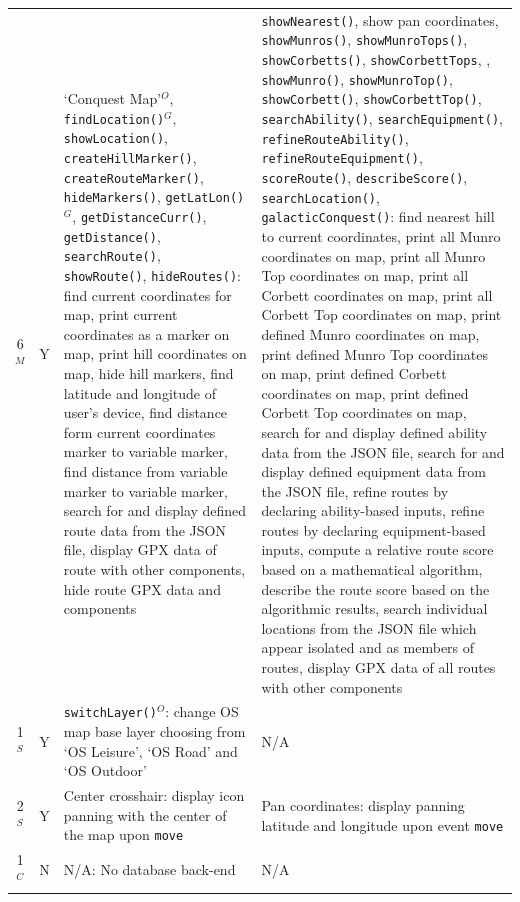 \documentclass[11pt, english]{article}
\begin{document}
\begin{center}
\begin{longtable}{ccp{5.5cm}p{5.5cm}}
		6$^M$ & Y & `Conquest Map'$^O$, \texttt{findLocation()}$^G$, \texttt{showLocation()}, \texttt{createHillMarker()}, \texttt{createRouteMarker()}, \texttt{hideMarkers()}, \texttt{getLatLon()}$^G$, \texttt{getDistanceCurr()}, \texttt{getDistance()}, \texttt{searchRoute()}, \texttt{showRoute()}, \texttt{hideRoutes()}: find current coordinates for map, print current coordinates as a marker on map, print hill coordinates on map, hide hill markers, find latitude and longitude of user's device, find distance form current coordinates marker to variable marker, find distance from variable marker to variable marker, search for and display defined route data from the JSON file, display GPX data of route with other components, hide route GPX data and components & \texttt{showNearest()}, show pan coordinates, \texttt{showMunros()}, \texttt{showMunroTops()}, \texttt{showCorbetts()}, \texttt{showCorbettTops}, , \texttt{showMunro()}, \texttt{showMunroTop()}, \texttt{showCorbett()}, \texttt{showCorbettTop()}, \texttt{searchAbility()}, \texttt{searchEquipment()}, \texttt{refineRouteAbility()}, \texttt{refineRouteEquipment()}, \texttt{scoreRoute()}, \texttt{describeScore()}, \texttt{searchLocation()}, \texttt{galacticConquest()}: find nearest hill to current coordinates, print all Munro coordinates on map, print all Munro Top coordinates on map, print all Corbett coordinates on map, print all Corbett Top coordinates on map, print defined Munro coordinates on map, print defined Munro Top coordinates on map, print defined Corbett coordinates on map, print defined Corbett Top coordinates on map, search for and display defined ability data from the JSON file, search for and display defined equipment data from the JSON file, refine routes by declaring ability-based inputs, refine routes by declaring equipment-based inputs, compute a relative route score based on a mathematical algorithm, describe the route score based on the algorithmic results, search individual locations from the JSON file which appear isolated and as members of routes, display GPX data of all routes with other components\\
		1$^S$ & Y & \texttt{switchLayer()$^O$}: change OS map base layer choosing from `OS Leisure', `OS Road' and `OS Outdoor' & N/A\\
		2$^S$ & Y & Center crosshair: display icon panning with the center of the map upon \texttt{move} & Pan coordinates: display panning latitude and longitude upon event \texttt{move}\\
		1$^C$ & N & N/A: No database back-end & N/A\\

\end{longtable}
\end{center}
\end{document}
